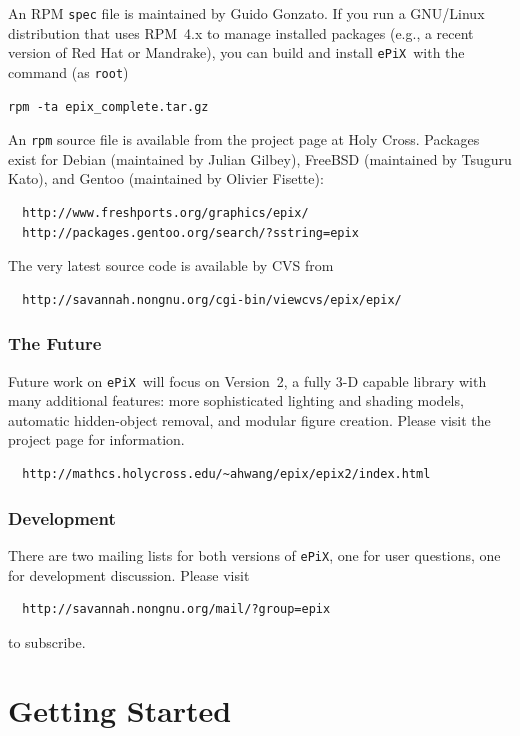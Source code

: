 \documentclass[12pt]{report}
\newcommand{\code}[1]{\texttt{#1}}
\newcommand{\filename}[1]{\texttt{#1}}
\newcommand{\ePiX}{\code{ePiX}}
\begin{document}
An RPM \filename{spec} file is maintained by Guido Gonzato. If you run
a GNU/Linux distribution that uses RPM~4.x to manage installed
packages (e.g., a recent version of Red Hat or Mandrake), you can
build and install \ePiX\ with the command (as \code{root})
\begin{verbatim}
rpm -ta epix_complete.tar.gz
\end{verbatim}
An \filename{rpm} source file is available from the project page at
Holy Cross. Packages exist for Debian (maintained by Julian Gilbey),
FreeBSD (maintained by Tsuguru Kato), and Gentoo (maintained by
Olivier Fisette):
\begin{verbatim}
  http://www.freshports.org/graphics/epix/
  http://packages.gentoo.org/search/?sstring=epix
\end{verbatim}
The very latest source code is available by CVS from
\begin{verbatim}
  http://savannah.nongnu.org/cgi-bin/viewcvs/epix/epix/
\end{verbatim}


\subsection*{The Future}

Future work on \ePiX\ will focus on Version~2, a fully 3-D capable
library with many additional features: more sophisticated lighting and
shading models, automatic hidden-object removal, and modular figure
creation. Please visit the project page for information.
\begin{verbatim}
  http://mathcs.holycross.edu/~ahwang/epix/epix2/index.html
\end{verbatim}

\subsection*{Development}

There are two mailing lists for both versions of \ePiX, one for user
questions, one for development discussion. Please visit
\begin{verbatim}
  http://savannah.nongnu.org/mail/?group=epix
\end{verbatim}
to subscribe.


\chapter{Getting Started}
\label{chapter:started}
\end{document}
